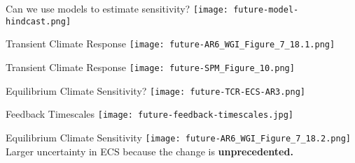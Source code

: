 \documentclass[aspectratio=169]{beamer}
\begin{document}


\begin{frame}{Can we use models to estimate sensitivity?}
    \centering
    \texttt{[image: future-model-hindcast.png]}


\end{frame}

\begin{frame}{Transient Climate Response}
    \centering
    \texttt{[image: future-AR6\_WGI\_Figure\_7\_18.1.png]}
\end{frame}

\begin{frame}{Transient Climate Response}
    \centering
    \texttt{[image: future-SPM\_Figure\_10.png]}
\end{frame}

\begin{frame}{Equilibrium Climate Sensitivity?}
    \centering
    \texttt{[image: future-TCR-ECS-AR3.png]}
\end{frame}

\begin{frame}{Feedback Timescales}
    \centering
    \texttt{[image: future-feedback-timescales.jpg]}
\end{frame}

\begin{frame}{Equilibrium Climate Sensitivity}
    \centering
    \texttt{[image: future-AR6\_WGI\_Figure\_7\_18.2.png]}
    Larger uncertainty in ECS because the change is \textbf{unprecedented.}
\end{frame}
\end{document}
